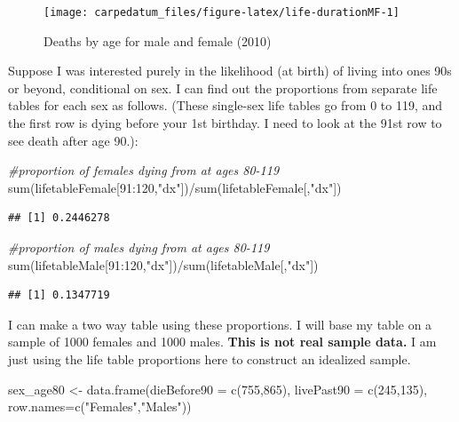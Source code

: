 \documentclass[
  openany]{book}
\newenvironment{Shaded}{\begin{snugshade}}{\end{snugshade}}
\newcommand{\AttributeTok}[1]{\textcolor[rgb]{0.77,0.63,0.00}{#1}}
\newcommand{\CommentTok}[1]{\textcolor[rgb]{0.56,0.35,0.01}{\textit{#1}}}
\newcommand{\DecValTok}[1]{\textcolor[rgb]{0.00,0.00,0.81}{#1}}
\newcommand{\FunctionTok}[1]{\textcolor[rgb]{0.00,0.00,0.00}{#1}}
\newcommand{\NormalTok}[1]{#1}
\newcommand{\OtherTok}[1]{\textcolor[rgb]{0.56,0.35,0.01}{#1}}
\newcommand{\SpecialCharTok}[1]{\textcolor[rgb]{0.00,0.00,0.00}{#1}}
\newcommand{\StringTok}[1]{\textcolor[rgb]{0.31,0.60,0.02}{#1}}
\begin{document}
\begin{figure}[H]

{\centering \texttt{[image: carpedatum\_files/figure-latex/life-durationMF-1]}

}

\caption{Deaths by age for male and female (2010)}\label{fig:life-durationMF}
\end{figure}

Suppose I was interested purely in the likelihood (at birth) of living into ones 90s or beyond, conditional on sex. I can find out the proportions from separate life tables for each sex as follows. (These single-sex life tables go from 0 to 119, and the first row is dying before your 1st birthday. I need to look at the 91st row to see death after age 90.):

\begin{Shaded}
\begin{Highlighting}[]
\CommentTok{\#proportion of females dying from at ages 80{-}119}
\FunctionTok{sum}\NormalTok{(lifetableFemale[}\DecValTok{91}\SpecialCharTok{:}\DecValTok{120}\NormalTok{,}\StringTok{"dx"}\NormalTok{])}\SpecialCharTok{/}\FunctionTok{sum}\NormalTok{(lifetableFemale[,}\StringTok{"dx"}\NormalTok{])}
\end{Highlighting}
\end{Shaded}

\begin{verbatim}
## [1] 0.2446278
\end{verbatim}

\begin{Shaded}
\begin{Highlighting}[]
\CommentTok{\#proportion of males dying from at ages 80{-}119}
\FunctionTok{sum}\NormalTok{(lifetableMale[}\DecValTok{91}\SpecialCharTok{:}\DecValTok{120}\NormalTok{,}\StringTok{"dx"}\NormalTok{])}\SpecialCharTok{/}\FunctionTok{sum}\NormalTok{(lifetableMale[,}\StringTok{"dx"}\NormalTok{])}
\end{Highlighting}
\end{Shaded}

\begin{verbatim}
## [1] 0.1347719
\end{verbatim}

I can make a two way table using these proportions. I will base my table on a sample of 1000 females and 1000 males. \textbf{This is not real sample data.} I am just using the life table proportions here to construct an idealized sample.

\begin{Shaded}
\begin{Highlighting}[]
\NormalTok{sex\_age80 }\OtherTok{\textless{}{-}} \FunctionTok{data.frame}\NormalTok{(}\AttributeTok{dieBefore90 =} \FunctionTok{c}\NormalTok{(}\DecValTok{755}\NormalTok{,}\DecValTok{865}\NormalTok{), }\AttributeTok{livePast90 =} \FunctionTok{c}\NormalTok{(}\DecValTok{245}\NormalTok{,}\DecValTok{135}\NormalTok{), }
                        \AttributeTok{row.names=}\FunctionTok{c}\NormalTok{(}\StringTok{"Females"}\NormalTok{,}\StringTok{"Males"}\NormalTok{))}
\end{Highlighting}
\end{Shaded}
\end{document}
